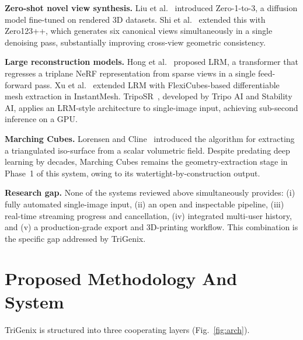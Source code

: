 \documentclass[conference]{IEEEtran}
\begin{document}
\textbf{Zero-shot novel view synthesis.}
Liu et al.~\cite{zero1to3} introduced Zero-1-to-3, a diffusion model fine-tuned on rendered 3D datasets.
Shi et al.~\cite{zero123pp} extended this with Zero123++, which generates six canonical views simultaneously
in a single denoising pass, substantially improving cross-view geometric consistency.

\textbf{Large reconstruction models.}
Hong et al.~\cite{lrm} proposed LRM, a transformer that regresses a triplane NeRF representation from sparse
views in a single feed-forward pass. Xu et al.~\cite{instantmesh} extended LRM with FlexiCubes-based
differentiable mesh extraction in InstantMesh. TripoSR~\cite{triposr}, developed by Tripo AI and Stability AI,
applies an LRM-style architecture to single-image input, achieving sub-second inference on a GPU.

\textbf{Marching Cubes.}
Lorensen and Cline~\cite{marching_cubes} introduced the algorithm for extracting a triangulated iso-surface from
a scalar volumetric field. Despite predating deep learning by decades, Marching Cubes remains the geometry-extraction
stage in Phase~1 of this system, owing to its watertight-by-construction output.

\textbf{Research gap.}
None of the systems reviewed above simultaneously provides: (i) fully automated single-image input, (ii) an
open and inspectable pipeline, (iii) real-time streaming progress and cancellation, (iv) integrated multi-user
history, and (v) a production-grade export and 3D-printing workflow. This combination is the specific gap
addressed by TriGenix.

\section{Proposed Methodology And System}

TriGenix is structured into three cooperating layers (Fig.~\ref{fig:arch}).
\end{document}
